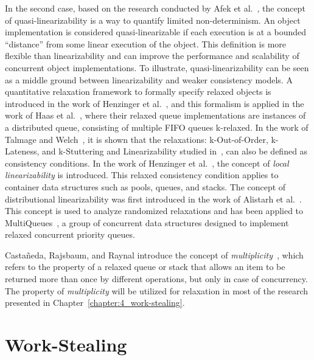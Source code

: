 In the second case, based on the research conducted by Afek et al.~\cite{DBLP_conf_opodis_AfekKY10}, the concept of quasi-linearizability is a way to quantify limited non-determinism. An object implementation is considered quasi-linearizable if each execution is at a bounded ``distance'' from some linear execution of the object. This definition is more flexible than linearizability and can improve the performance and scalability of concurrent object implementations. To illustrate, quasi-linearizability can be seen as a middle ground between linearizability and weaker consistency models. A quantitative relaxation framework to formally specify relaxed objects is introduced in the work of Henzinger et al.~\cite{DBLP_conf_popl_HenzingerKPSS13}, and this formalism is applied in the work of Haas et al.~\cite{DBLP_conf_cf_HaasLHPSKS13}, where their relaxed queue implementations are instances of a distributed queue, consisting of multiple FIFO queues k-relaxed. In the work of Talmage and Welch~\cite{DBLP_journals_algorithms_TalmageW18}, it is shown that the relaxations: k-Out-of-Order, k-Lateness, and k-Stuttering and Linearizability studied in~\cite{DBLP_conf_popl_HenzingerKPSS13},  can also be defined as consistency conditions. In the work of Henzinger et al.~\cite{DBLP_conf_concur_HaasHHKLPSSV16}, the concept of \textit{local linearizability} is introduced. This relaxed consistency condition applies to container data structures such as pools, queues, and stacks. The concept of distributional linearizability was first introduced in the work of Alistarh et al.~\cite{DBLP_conf_spaa_Alistarh0KLN18}. This concept is used to analyze randomized relaxations and has been applied to MultiQueues~\cite{DBLP_conf_spaa_RihaniSD15}, a group of concurrent data structures designed to implement relaxed concurrent priority queues.

Castañeda, Rajsbaum, and Raynal introduce the concept of \emph{multiplicity}~\cite{DBLP_journals_dc_CastanedaRR23, DBLP_conf_opodis_CastanedaRR20}, which refers to the property of a relaxed queue or stack that allows an item to be returned more than once by different operations, but only in case of concurrency. The property of \emph{multiplicity} will be utilized for relaxation in most of the research presented in Chapter~\ref{chapter:4_work-stealing}.

\section{\label{section:work-stealing}Work-Stealing}

